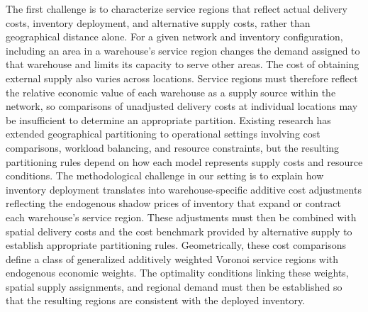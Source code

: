 \documentclass[a4paper,fleqn]{cas-sc}
\theoremstyle{remark}
\theoremstyle{plain}
\begin{document}
The first challenge is to characterize service regions that reflect actual delivery costs, inventory deployment, and alternative supply costs, rather than geographical distance alone. For a given network and inventory configuration, including an area in a warehouse's service region changes the demand assigned to that warehouse and limits its capacity to serve other areas. The cost of obtaining external supply also varies across locations. Service regions must therefore reflect the relative economic value of each warehouse as a supply source within the network, so comparisons of unadjusted delivery costs at individual locations may be insufficient to determine an appropriate partition. Existing research has extended geographical partitioning to operational settings involving cost comparisons, workload balancing, and resource constraints, but the resulting partitioning rules depend on how each model represents supply costs and resource conditions. The methodological challenge in our setting is to explain how inventory deployment translates into warehouse-specific additive cost adjustments reflecting the endogenous shadow prices of inventory that expand or contract each warehouse's service region. These adjustments must then be combined with spatial delivery costs and the cost benchmark provided by alternative supply to establish appropriate partitioning rules. Geometrically, these cost comparisons define a class of generalized additively weighted Voronoi service regions \citep{carlsson2026equitable} with endogenous economic weights. The optimality conditions linking these weights, spatial supply assignments, and regional demand must then be established so that the resulting regions are consistent with the deployed inventory.
\end{document}
